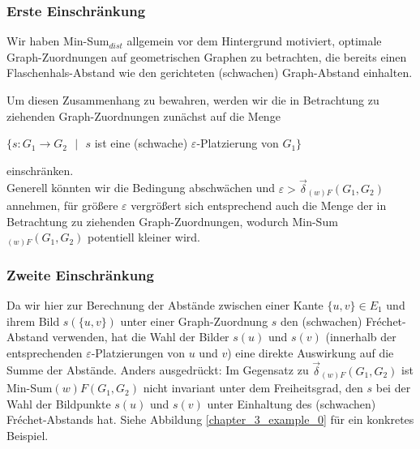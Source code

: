 \documentclass[a4paper, 12pt, twoside]{article}
\theoremstyle{Format1} %
\begin{document}
\subsubsection{Erste Einschränkung} \label{Erste Einschränkung}

Wir haben Min-Sum$_{dist}$ allgemein vor dem Hintergrund motiviert, optimale Graph-Zuordnungen auf geometrischen Graphen zu betrachten,
die bereits einen Flaschenhals-Abstand wie den gerichteten (schwachen) Graph-Abstand einhalten.

Um diesen Zusammenhang zu bewahren, werden wir die in Betrachtung zu ziehenden Graph-Zuordnungen zunächst auf die Menge
\begin{center}
	$\{s: G_1 \to G_2 \text{ $|$ } s$ ist eine (schwache) $\varepsilon$-Platzierung von $G_1 \}$
\end{center}
einschränken.
\\
Generell könnten wir die Bedingung abschwächen und $\varepsilon > \vec{\delta}_{(w)F}(G_1, G_2)$ annehmen, für größere $\varepsilon$ vergrößert
sich entsprechend auch die Menge der in Betrachtung zu ziehenden Graph-Zuordnungen, wodurch Min-Sum$_{(w)F}(G_1, G_2)$ potentiell kleiner wird.

\subsubsection{Zweite Einschränkung} \label {Zweite Einschränkung}
Da wir hier zur Berechnung der Abstände zwischen einer Kante $\{u,v\} \in E_1$ und ihrem Bild $s(\{u,v\})$ unter einer Graph-Zuordnung $s$ den (schwachen) Fréchet-Abstand verwenden,
hat die Wahl der Bilder $s(u)$ und $s(v)$ (innerhalb der entsprechenden $\varepsilon$-Platzierungen von $u$ und $v$) eine direkte Auswirkung auf die Summe der Abstände.
Anders ausgedrückt: Im Gegensatz zu $\vec{\delta}_{(w)F}(G_1,G_2)$ ist Min-Sum${(w)F}(G_1,G_2)$ nicht invariant unter dem Freiheitsgrad, den $s$
bei der Wahl der Bildpunkte $s(u)$ und $s(v)$ unter Einhaltung des (schwachen) Fréchet-Abstands hat. Siehe Abbildung \ref{chapter_3_example_0} für ein konkretes Beispiel.
\end{document}
